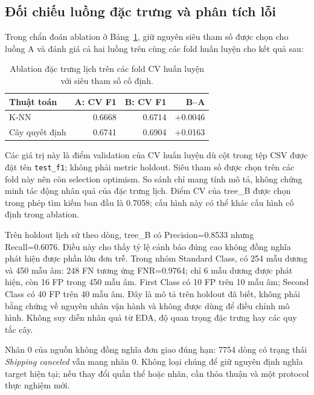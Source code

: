 \subsection{Đối chiếu luồng đặc trưng và phân tích lỗi}
Trong chẩn đoán ablation ở Bảng~\ref{tab:calendar-ablation}, giữ nguyên siêu tham số được chọn cho luồng A và
đánh giá cả hai luồng trên cùng các fold huấn luyện cho kết quả sau:
\begin{table}[!htbp]
\centering
\begin{tabular}{lrrr}
\toprule
Thuật toán & A: CV F1 & B: CV F1 & B--A \\
\midrule
K-NN & 0.6668 & 0.6714 & +0.0046 \\
Cây quyết định & 0.6741 & 0.6904 & +0.0163 \\
\bottomrule
\end{tabular}
\caption{Ablation đặc trưng lịch trên các fold CV huấn luyện với siêu tham số cố định.}\label{tab:calendar-ablation}
\end{table}
Các giá trị này là điểm validation của CV huấn luyện dù cột trong tệp CSV
được đặt tên \texttt{test\_f1}; không phải metric holdout. Siêu tham số được
chọn trên các fold này nên còn selection optimism. So sánh chỉ mang tính mô
tả, không chứng minh tác động nhân quả của đặc trưng lịch. Điểm CV của tree\_B
được chọn trong phép tìm kiếm ban đầu là 0.7058; cấu hình này có thể khác cấu
hình cố định trong ablation.

Trên holdout lịch sử theo dòng, tree\_B có Precision=0.8533 nhưng Recall=0.6076.
Điều này cho thấy tỷ lệ cảnh báo đúng cao không đồng nghĩa phát hiện được phần
lớn đơn trễ. Trong nhóm Standard Class, có 254 mẫu dương và 450 mẫu âm:
248 FN tương ứng FNR=0.9764; chỉ 6 mẫu dương được phát hiện, còn 16 FP trong
450 mẫu âm. First Class có 10 FP trên 10 mẫu âm; Second Class có 40 FP trên
40 mẫu âm. Đây là mô tả trên holdout đã biết, không phải bằng chứng về nguyên
nhân vận hành và không được dùng để điều chỉnh mô hình.
Không suy diễn nhân quả từ EDA, độ quan trọng đặc trưng hay các quy tắc cây.

Nhãn 0 của nguồn không đồng nghĩa đơn giao đúng hạn: 7754 dòng có trạng thái
\textit{Shipping canceled} vẫn mang nhãn 0. Không loại chúng để giữ nguyên định
nghĩa target hiện tại; nếu thay đổi quần thể hoặc nhãn, cần thỏa thuận và một
protocol thực nghiệm mới.
